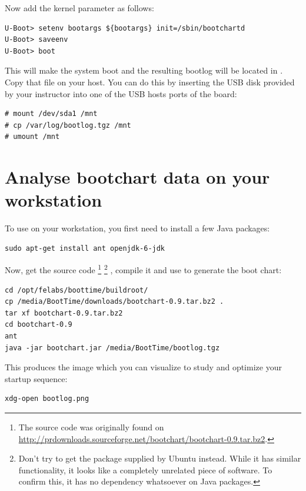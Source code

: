 Now add the  kernel parameter as follows:

\begin{verbatim}
U-Boot> setenv bootargs ${bootargs} init=/sbin/bootchartd
U-Boot> saveenv
U-Boot> boot
\end{verbatim}

This will make the system boot and the resulting bootlog will be located
in . Copy that file on your host. You can do
this by inserting the USB disk provided by your instructor into one of
the USB hosts ports of the board:

\begin{verbatim}
# mount /dev/sda1 /mnt
# cp /var/log/bootlog.tgz /mnt
# umount /mnt
\end{verbatim}

\section{Analyse bootchart data on your workstation}

To use  on your workstation, you first need to
install a few Java packages:

\begin{verbatim}
sudo apt-get install ant openjdk-6-jdk
\end{verbatim}

Now, get the  source code 
\footnote{The source code was originally found on
\url{http://prdownloads.sourceforge.net/bootchart/bootchart-0.9.tar.bz2}.}
\footnote{Don't try to get the  package supplied by
Ubuntu instead. While it has similar functionality, it looks like a completely
unrelated piece of software. To confirm this, it has no dependency
whatsoever on Java packages.}
, compile it and use  to generate the boot
chart:

\begin{verbatim}
cd /opt/felabs/boottime/buildroot/
cp /media/BootTime/downloads/bootchart-0.9.tar.bz2 .
tar xf bootchart-0.9.tar.bz2
cd bootchart-0.9
ant
java -jar bootchart.jar /media/BootTime/bootlog.tgz
\end{verbatim}

This produces the  image which you can visualize to
study and optimize your startup sequence:

\begin{verbatim}
xdg-open bootlog.png
\end{verbatim}

